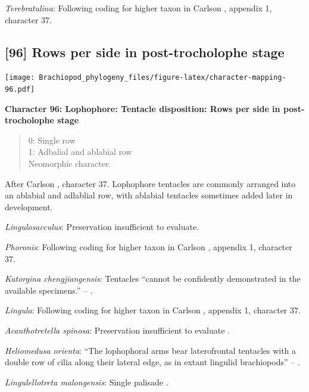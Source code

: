 \documentclass[]{book}
\theoremstyle{definition}
\theoremstyle{definition}
\theoremstyle{definition}
\theoremstyle{remark}
\begin{document}
\emph{Terebratulina}: Following coding for higher taxon in Carlson
\citeyearpar{Carlson1995Phylogeneticrelationships}, appendix 1,
character 37.

\hypertarget{rows-per-side-in-post-trocholophe-stage}{%
\subsection*{{[}96{]} Rows per side in post-trocholophe
stage}\label{rows-per-side-in-post-trocholophe-stage}}

\texttt{[image: Brachiopod\_phylogeny\_files/figure-latex/character-mapping-96.pdf]}

\textbf{Character 96: Lophophore: Tentacle disposition: Rows per side in
post-trocholophe stage}

\begin{quote}
0: Single row\\
1: Adbalial and ablabial row\\
Neomorphic character.
\end{quote}

After Carlson \citeyearpar{Carlson1995Phylogeneticrelationships},
character 37. Lophophore tentacles are commonly arranged into an
ablabial and adlablial row, with ablabial tentacles sometimes added
later in development.

\emph{Lingulosacculus}: Preservation insufficient to evaluate.

\emph{Phoronis}: Following coding for higher taxon in Carlson
\citeyearpar{Carlson1995Phylogeneticrelationships}, appendix 1,
character 37.

\emph{Kutorgina chengjiangensis}: Tentacles ``cannot be confidently
demonstrated in the available specimens.'' --
\citet{Zhang2007Rhynchonelliformeanbrachiopods}.

\emph{Lingula}: Following coding for higher taxon in Carlson
\citeyearpar{Carlson1995Phylogeneticrelationships}, appendix 1,
character 37.

\emph{Acanthotretella spinosa}: Preservation insufficient to evaluate
\citep{Holmer2006Aspinose}.

\emph{Heliomedusa orienta}: ``The lophophoral arms bear laterofrontal
tentacles with a double row of cilia along their lateral edge, as in
extant lingulid brachiopods'' -- \citet{Zhang2009Architectureand}.

\emph{Lingulellotreta malongensis}: Single palisade
\citep{Zhang2004Newdata}.
\end{document}
